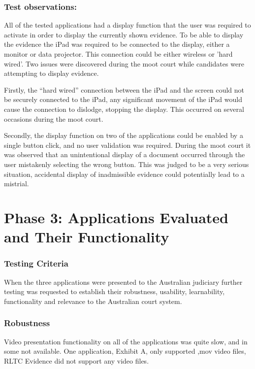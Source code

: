 \subsubsection{Test observations:}
All of the tested applications had a display function that the user was required to activate in order to display the currently shown evidence. To be able to display the evidence the iPad was required to be connected to the display, either a monitor or data projector. This connection could be either wireless or 'hard wired'. Two issues were discovered during the moot court while candidates were attempting to display evidence. 

Firstly, the ``hard wired'' connection between the iPad and the screen could not be securely connected to the iPad, any significant movement of the iPad would cause the connection to dislodge, stopping the display. This occurred on several occasions during the moot court.

Secondly, the display function on two of the applications could be enabled by a single button click, and no user validation was required. During the moot court it was observed that an unintentional display of a document occurred through the user mistakenly selecting the wrong button. This was judged to be a very serious situation, accidental display of inadmissible evidence could potentially lead to a mistrial.



\section{Phase 3: Applications Evaluated and Their Functionality\label{Phase3}} %
\subsubsection{Testing Criteria}
When the three applications were presented to the Australian judiciary further testing was requested to establish their robustness, usability, learnability, functionality and relevance to the Australian court system.

\subsubsection{Robustness}
Video presentation functionality on all of the applications was quite slow, and in some not available. One application, Exhibit A, only supported ,mov video files, RLTC Evidence did not support any video files.

